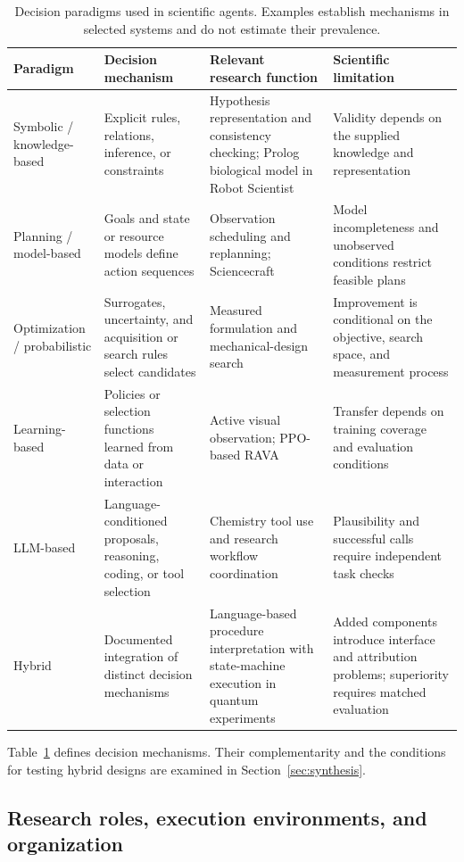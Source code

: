 \begin{table}[H]
\caption{Decision paradigms used in scientific agents. Examples establish mechanisms in selected systems and do not estimate their prevalence.}
\label{tab:paradigms}
\scriptsize
\begin{tabularx}{\textwidth}{@{}p{}XXX@{}}
\toprule
Paradigm & Decision mechanism & Relevant research function & Scientific limitation \\
\midrule
Symbolic / knowledge-based & Explicit rules, relations, inference, or constraints & Hypothesis representation and consistency checking; Prolog biological model in Robot Scientist~\cite{king2004} & Validity depends on the supplied knowledge and representation \\
Planning / model-based & Goals and state or resource models define action sequences & Observation scheduling and replanning; Sciencecraft~\cite{asd0645} & Model incompleteness and unobserved conditions restrict feasible plans \\
Optimization / probabilistic & Surrogates, uncertainty, and acquisition or search rules select candidates & Measured formulation and mechanical-design search~\cite{burger2020,asd0504} & Improvement is conditional on the objective, search space, and measurement process \\
Learning-based & Policies or selection functions learned from data or interaction & Active visual observation; PPO-based RAVA~\cite{asd1133} & Transfer depends on training coverage and evaluation conditions \\
LLM-based & Language-conditioned proposals, reasoning, coding, or tool selection & Chemistry tool use and research workflow coordination~\cite{bran2024,asd0018} & Plausibility and successful calls require independent task checks \\
Hybrid & Documented integration of distinct decision mechanisms & Language-based procedure interpretation with state-machine execution in quantum experiments~\cite{asd0090} & Added components introduce interface and attribution problems; superiority requires matched evaluation \\
\bottomrule
\end{tabularx}
\end{table}

Table~\ref{tab:paradigms} defines decision mechanisms. Their complementarity and the conditions for testing hybrid designs are examined in Section~\ref{sec:synthesis}.

\subsection{Research roles, execution environments, and organization}

